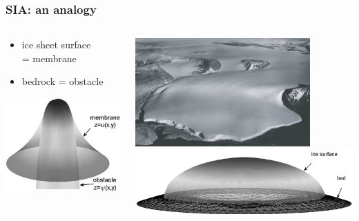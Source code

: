 \documentclass{beamer}
\begin{document}
\begin{frame}
  \frametitle{SIA: an analogy}

\begin{columns}
\begin{column}{0.35\textwidth}
\begin{itemize}
\item ice sheet surface \\ = \alert{membrane}
\item bedrock = \alert{obstacle}
\end{itemize}
\vfill
\begin{center}
\includegraphics[width=1.1\textwidth]{classicalobs}
\end{center}
\end{column}
\begin{column}{0.65\textwidth}
\begin{center}
\includegraphics[width=0.8\textwidth]{polaris} \\
\includegraphics[width=\textwidth]{capnonflatobs}
\end{center}
\end{column}
\end{columns}
\end{frame}
\end{document}
